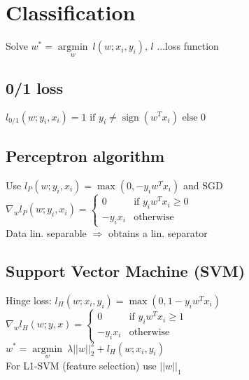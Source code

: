 \section*{Classification}

Solve $w^* = \underset{w}{\operatorname{argmin}} ~ l(w;x_i,y_i)$, $l$ ...loss function

\subsection*{0/1 loss}
$l_{0/1} (w;y_i,x_i) = 1 \text{ if } y_i \neq \operatorname{sign}(w^Tx_i) \text{ else } 0$

\subsection*{Perceptron algorithm}
Use $l_P (w;y_i,x_i) = \operatorname{max}(0, -y_i w^T x_i)$ and SGD\\
$\nabla_w l_P(w;y_i,x_i) = 
\begin{cases}
    0 &\text{if } y_i w^T x_i \geq 0\\
    -y_i x_i &\text{otherwise}
\end{cases}$ \\
Data lin. separable $\Rightarrow$ obtains a lin. separator

\subsection*{Support Vector Machine (SVM)}
Hinge loss: $l_H(w;x_i,y_i) = \operatorname{max}(0,1-y_i w^T x_i)$ \\
$\nabla_w l_H(w;y,x) = 
\begin{cases}
    0 &\text{if } y_i w^T x_i \geq 1\\
    -y_i x_i &\text{otherwise}
\end{cases}$\\
$w^* = \underset{w}{\operatorname{argmin}} ~ \lambda||w||_2^2 + l_H(w;x_i,y_i)$\\ For L1-SVM (feature selection) use $||w||_1$ 